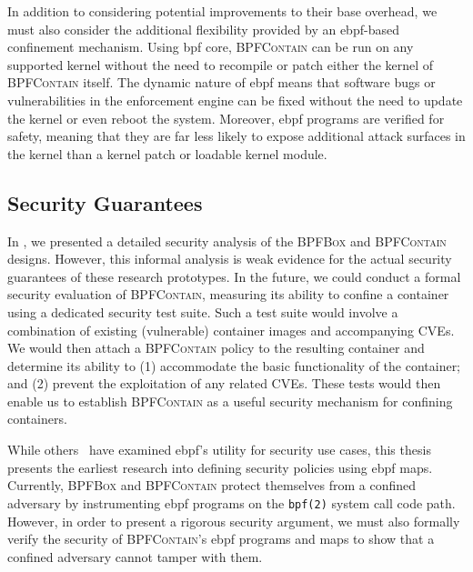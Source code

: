 \documentclass[
  fontsize=12pt,
  titlepage=firstiscover,
  paper=letter,
oneside,
  cleardoublepage=plain,
  parskip=half-,
  DIV=10,
  parindent,
  appendixprefix,
  chapterprefix,
  listof=totoc,
]{scrbook}
\newcommand{\bpfbox}{\textsc{BPFBox}}
\newcommand{\bpfcontain}{\textsc{BPFContain}}
\begin{document}
In addition to considering potential improvements to their base overhead, we must also
consider the additional flexibility provided by an \gls{ebpf}-based confinement mechanism.
Using \gls{bpf} \gls{core}, \bpfcontain{} can be run on any supported kernel without the
need to recompile or patch either the kernel of \bpfcontain{} itself. The dynamic nature
of \gls{ebpf} means that software bugs or vulnerabilities in the enforcement engine can be
fixed without the need to update the kernel or even reboot the system. Moreover,
\gls{ebpf} programs are verified for safety, meaning that they are far less likely to
expose additional attack surfaces in the kernel than a kernel patch or loadable kernel
module.







\subsection{Security Guarantees}\label{ss:disc-guarantees}

In , we presented a detailed security analysis of the \bpfbox{} and
\bpfcontain{} designs.  However, this informal analysis is weak evidence for the actual
security guarantees of these research prototypes.  In the future, we could conduct
a formal security evaluation of \bpfcontain{}, measuring its ability to confine
a container using a dedicated security test suite. Such a test suite would involve
a combination of existing (vulnerable) container images and accompanying CVEs. We would
then attach a \bpfcontain{} policy to the resulting container and determine its ability to
(1) accommodate the basic functionality of the container; and (2) prevent the exploitation
of any related CVEs. These tests would then enable us to establish \bpfcontain{}
as a useful security mechanism for confining containers.

While others~\cite{tracee, cilium} have examined \gls{ebpf}'s utility for security use
cases, this thesis presents the earliest research into defining security policies using
\gls{ebpf} maps. Currently, \bpfbox{} and \bpfcontain{} protect themselves from a confined
adversary by instrumenting \gls{ebpf} programs on the \texttt{bpf(2)} system call code
path. However, in order to present a rigorous security argument, we must also formally
verify the security of \bpfcontain{}'s \gls{ebpf} programs and maps to show that
a confined adversary cannot tamper with them.
\end{document}
